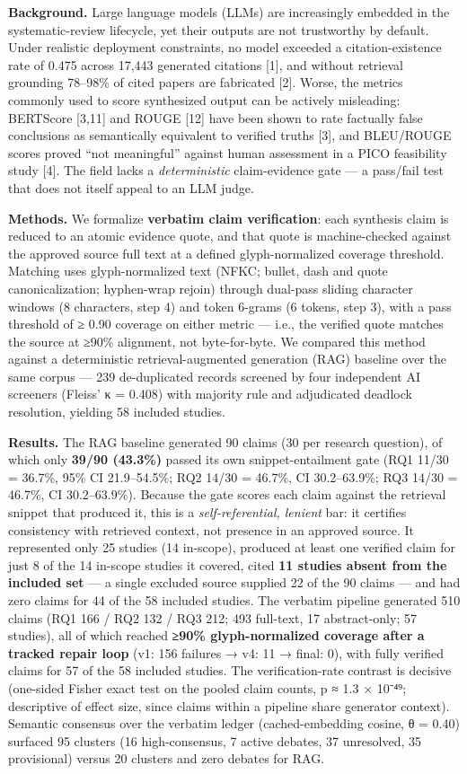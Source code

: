 \documentclass[11pt]{article}
\begin{document}
\textbf{Background.} Large language models (LLMs) are increasingly
embedded in the systematic-review lifecycle, yet their outputs are not
trustworthy by default. Under realistic deployment constraints, no model
exceeded a citation-existence rate of 0.475 across 17,443 generated
citations {[}1{]}, and without retrieval grounding 78--98\% of cited
papers are fabricated {[}2{]}. Worse, the metrics commonly used to score
synthesized output can be actively misleading: BERTScore {[}3,11{]} and
ROUGE {[}12{]} have been shown to rate factually false conclusions as
semantically equivalent to verified truths {[}3{]}, and BLEU/ROUGE
scores proved ``not meaningful'' against human assessment in a PICO
feasibility study {[}4{]}. The field lacks a \emph{deterministic}
claim-evidence gate --- a pass/fail test that does not itself appeal to
an LLM judge.

\textbf{Methods.} We formalize \textbf{verbatim claim verification}:
each synthesis claim is reduced to an atomic evidence quote, and that
quote is machine-checked against the approved source full text at a
defined glyph-normalized coverage threshold. Matching uses
glyph-normalized text (NFKC; bullet, dash and quote canonicalization;
hyphen-wrap rejoin) through dual-pass sliding character windows (8
characters, step 4) and token 6-grams (6 tokens, step 3), with a pass
threshold of ≥ 0.90 coverage on either metric --- i.e., the verified
quote matches the source at ≥90\% alignment, not byte-for-byte. We
compared this method against a deterministic retrieval-augmented
generation (RAG) baseline over the same corpus --- 239 de-duplicated
records screened by four independent AI screeners (Fleiss' κ = 0.408)
with majority rule and adjudicated deadlock resolution, yielding 58
included studies.

\textbf{Results.} The RAG baseline generated 90 claims (30 per research
question), of which only \textbf{39/90 (43.3\%)} passed its own
snippet-entailment gate (RQ1 11/30 = 36.7\%, 95\% CI 21.9--54.5\%; RQ2
14/30 = 46.7\%, CI 30.2--63.9\%; RQ3 14/30 = 46.7\%, CI 30.2--63.9\%).
Because the gate scores each claim against the retrieval snippet that
produced it, this is a \emph{self-referential, lenient} bar: it
certifies consistency with retrieved context, not presence in an
approved source. It represented only 25 studies (14 in-scope), produced
at least one verified claim for just 8 of the 14 in-scope studies it
covered, cited \textbf{11 studies absent from the included set} --- a
single excluded source supplied 22 of the 90 claims --- and had zero
claims for 44 of the 58 included studies. The verbatim pipeline
generated 510 claims (RQ1 166 / RQ2 132 / RQ3 212; 493 full-text, 17
abstract-only; 57 studies), all of which reached \textbf{≥90\%
glyph-normalized coverage after a tracked repair loop} (v1: 156 failures
→ v4: 11 → final: 0), with fully verified claims for 57 of the 58
included studies. The verification-rate contrast is decisive (one-sided
Fisher exact test on the pooled claim counts, p ≈ 1.3 × 10⁻⁴⁹;
descriptive of effect size, since claims within a pipeline share
generator context). Semantic consensus over the verbatim ledger
(cached-embedding cosine, θ = 0.40) surfaced 95 clusters (16
high-consensus, 7 active debates, 37 unresolved, 35 provisional) versus
20 clusters and zero debates for RAG.
\end{document}
